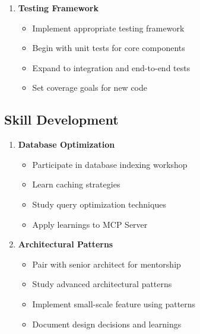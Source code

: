 \documentclass[10pt,a4paper]{article}
\begin{document}
\begin{multicols}{2}
\begin{enumerate}
  \item \textbf{Testing Framework}
    \begin{itemize}
      \item Implement appropriate testing framework
      \item Begin with unit tests for core components
      \item Expand to integration and end-to-end tests
      \item Set coverage goals for new code
    \end{itemize}
\end{enumerate}

\subsection*{Skill Development}
\begin{enumerate}\small
  \item \textbf{Database Optimization}
    \begin{itemize}
      \item Participate in database indexing workshop
      \item Learn caching strategies
      \item Study query optimization techniques
      \item Apply learnings to MCP Server
    \end{itemize}
  
  \item \textbf{Architectural Patterns}
    \begin{itemize}
      \item Pair with senior architect for mentorship
      \item Study advanced architectural patterns
      \item Implement small-scale feature using patterns
      \item Document design decisions and learnings
    \end{itemize}
\end{enumerate}
\end{multicols}

\clearpage %
\end{document}
